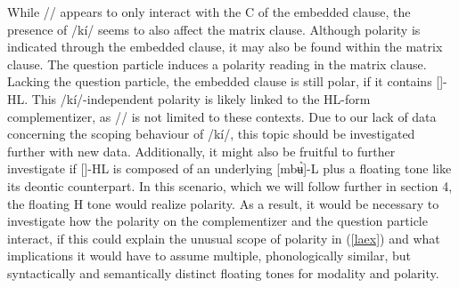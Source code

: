 \documentclass[output=paper,colorlinks,citecolor=brown]{langscibook}
\begin{document}
\ea \label{laex}
    \begin{xlist}
    \end{xlist}
\z

While /\la/ appears to only interact with the C of the embedded clause, the presence of /k{í}/ seems to also affect the matrix clause. Although polarity is indicated through the embedded clause, it may also be found within the matrix clause. The question particle induces a polarity reading in the matrix clause. Lacking the question particle, the embedded clause is still polar, if it contains [\mbuHL]-HL. This /k{í}/-independent polarity is likely linked to the HL-form complementizer, as /\la/ is not limited to these contexts. Due to our lack of data concerning the scoping behaviour of /k{í}/, this topic should be investigated further with new data. Additionally, it might also be fruitful to further investigate if [\mbuHL]-HL is composed of an underlying [mbʉ̀]-L plus a floating tone like its deontic counterpart. In this scenario, which we will follow further in section 4, the floating H tone would realize polarity. As a result, it would be necessary to investigate how the polarity on the complementizer and the question particle interact, if this could explain the unusual scope of polarity in (\ref{laex}) and what implications it would have to assume multiple, phonologically similar, but syntactically and semantically distinct floating tones for modality and polarity.
\end{document}
